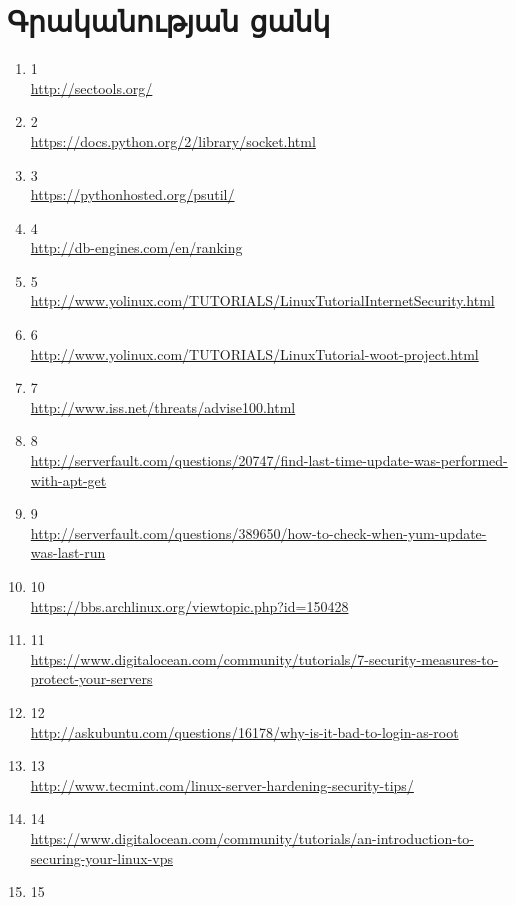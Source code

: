 \documentclass[a4paper,12pt]{article}
\begin{document}
\begin{sloppypar}
\section*{Գրականության ցանկ}
\begin{enumerate}
\item 1 \\
	\url{http://sectools.org/}
\item 2 \\
	\url{https://docs.python.org/2/library/socket.html}
\item 3 \\
	\url{https://pythonhosted.org/psutil/}
\item 4 \\
	\url{http://db-engines.com/en/ranking}
\item 5 \\
	\url{http://www.yolinux.com/TUTORIALS/LinuxTutorialInternetSecurity.html}
\item 6 \\
	\url{http://www.yolinux.com/TUTORIALS/LinuxTutorial-woot-project.html}
\item 7 \\
	\url{http://www.iss.net/threats/advise100.html}
\item 8 \\
	\url{http://serverfault.com/questions/20747/find-last-time-update-was-performed-with-apt-get}
\item 9 \\
	\url{http://serverfault.com/questions/389650/how-to-check-when-yum-update-was-last-run}
\item 10 \\
	\url{https://bbs.archlinux.org/viewtopic.php?id=150428}
\item 11 \\
	\url{https://www.digitalocean.com/community/tutorials/7-security-measures-to-protect-your-servers}
\item 12 \\
	\url{http://askubuntu.com/questions/16178/why-is-it-bad-to-login-as-root}
\item 13 \\
	\url{http://www.tecmint.com/linux-server-hardening-security-tips/}
\item 14 \\
	\url{https://www.digitalocean.com/community/tutorials/an-introduction-to-securing-your-linux-vps}
\item 15 \\

\end{enumerate}
\end{sloppypar}
\end{document}
